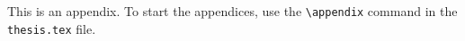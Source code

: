 This is an appendix. To start the appendices, use the \texttt{\textbackslash appendix} command in the \texttt{thesis.tex} file. 